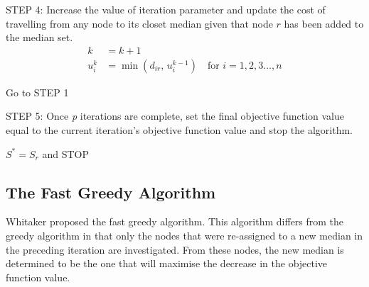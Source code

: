 \documentclass[11pt]{article}
\begin{document}
\begin{algorithm}
\begin{algorithmic}[0]
			
			\Statex 
			\Statex STEP 4: Increase the value of iteration parameter and update the cost of travelling from any node to its closet median given that node $r$ has been added to the median set.
			\begin{align*}
			k &= k+1\\
			u_i^k &= \min(d_{ir} \text{, } u_i^{k-1}) \quad \text{for } i = 1,2,3 \dots,n
			\end{align*}
			\Statex \begin{center} Go to STEP 1 \end{center}
			
			\Statex 
			\Statex STEP 5: Once \emph{p} iterations are complete, set the final objective function value equal to the current iteration's objective function value and stop the algorithm.
			\begin{center}
				$S^{*} = S_r$ and STOP
			\end{center}
			
			
		\end{algorithmic}
	\end{algorithm}

	
	
	\subsection{The Fast Greedy Algorithm} \label{fastgreedyalgo}
	Whitaker \cite{WHIT83}  proposed the fast greedy algorithm. This algorithm differs from the greedy algorithm in that only the nodes that were re-assigned to a new median in the preceding iteration are investigated.  From these nodes, the new median is determined to be the one that will maximise the decrease in the objective function value.
	
\end{document}
